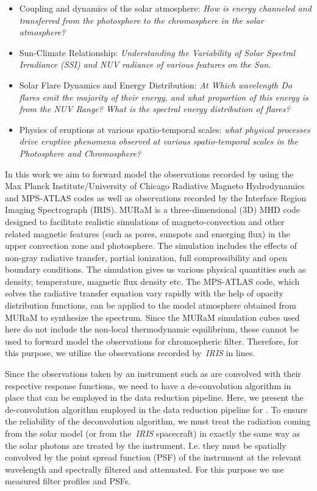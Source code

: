\begin{itemize}
    \item Coupling and dynamics of the solar atmosphere: {\it How is energy channeled and transferred from the photosphere to the chromosphere in the solar atmosphere?}
    \item Sun-Climate Relationship: {\it Understanding the Variability of Solar Spectral Irradiance (SSI) and NUV radiance of various features on the Sun.}
    \item Solar Flare Dynamics and Energy Distribution: {\it At Which wavelength Do flares emit the majority of their energy, and what proportion of this energy is from the NUV Range? What is the spectral energy distribution of flares?}
    \item Physics of eruptions at various spatio-temporal scales: {\it what physical processes drive eruptive phenomena observed at various spatio-temporal scales in the Photosphere and Chromosphere?}
\end{itemize}

In this work we aim to forward model the observations recorded by {\suit} using the Max Planck Institute/University of Chicago Radiative Magneto Hydrodynamics \citep[MURaM,][]{muram} and MPS-ATLAS codes as well as observations recorded by the Interface Region Imaging Spectrograph (IRIS). MURaM is a three-dimensional (3D) MHD code designed to facilitate realistic simulations of magneto-convection and other related magnetic features (such as pores, sunspots and emerging flux) in the upper convection zone and photosphere. The simulation includes the effects of non-gray radiative transfer, partial ionization, full compressibility and open boundary conditions. The simulation gives us various physical quantities such as density, temperature, magnetic flux density etc. The MPS-ATLAS \citep{witzke12} code, which solves the radiative transfer equation vary rapidly with the help of opacity distribution functions, can be applied to the model atmosphere obtained from MURaM  to synthesize the spectrum. Since the MURaM simulation cubes used here do not include the non-local thermodynamic equilibrium, these cannot be used to forward model the observations for chromospheric filter. Therefore, for this purpose, we utilize the observations recorded by~{\it IRIS} in  lines. 

Since the observations taken by an instrument such as {\suit} are convolved with their respective response functions, we need to have a de-convolution algorithm in place that can be employed in the data reduction pipeline. Here, we present the de-convolution algorithm employed in the data reduction pipeline for {\suit}. To ensure the reliability of the deconvolution algorithm, we must treat the radiation coming from the solar model (or from the~{\it IRIS} spacecraft) in exactly the same way as the solar photons are treated by the instrument. I.e. they must be spatially convolved by the point spread function (PSF) of the instrument at the relevant wavelength and spectrally filtered and attenuated. For this purpose we use measured filter profiles and PSFs. %

